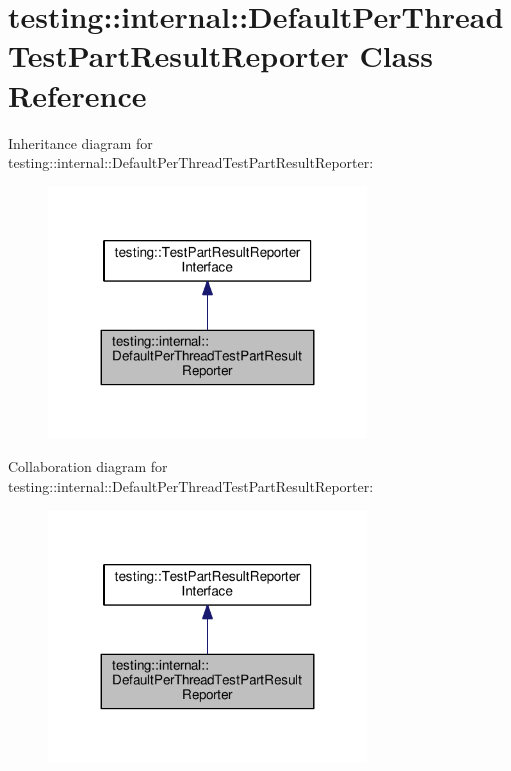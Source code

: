 \hypertarget{classtesting_1_1internal_1_1DefaultPerThreadTestPartResultReporter}{}\section{testing\+:\+:internal\+:\+:Default\+Per\+Thread\+Test\+Part\+Result\+Reporter Class Reference}
\label{classtesting_1_1internal_1_1DefaultPerThreadTestPartResultReporter}


Inheritance diagram for testing\+:\+:internal\+:\+:Default\+Per\+Thread\+Test\+Part\+Result\+Reporter\+:\nopagebreak
\begin{figure}[H]
\begin{center}
\leavevmode
\includegraphics[width=239pt]{classtesting_1_1internal_1_1DefaultPerThreadTestPartResultReporter__inherit__graph}
\end{center}
\end{figure}


Collaboration diagram for testing\+:\+:internal\+:\+:Default\+Per\+Thread\+Test\+Part\+Result\+Reporter\+:\nopagebreak
\begin{figure}[H]
\begin{center}
\leavevmode
\includegraphics[width=239pt]{classtesting_1_1internal_1_1DefaultPerThreadTestPartResultReporter__coll__graph}
\end{center}
\end{figure}
